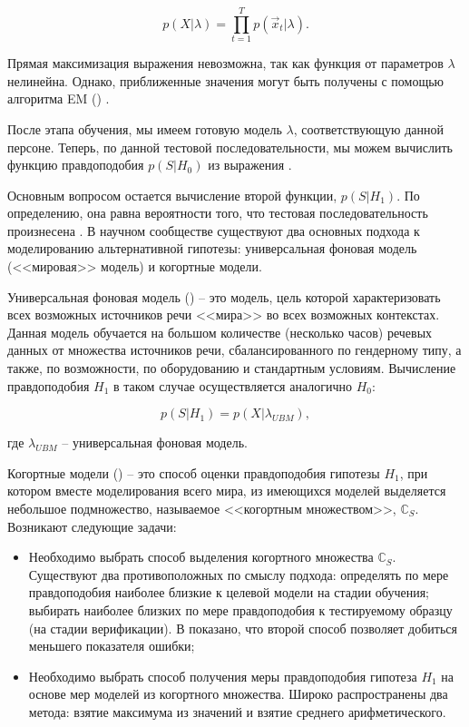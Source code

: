\begin{equation}
\label{eq:likelihood}
p(X | \lambda) = \prod_{t=1}^T p(\vec x_t | \lambda).
\end{equation}

Прямая максимизация выражения  невозможна, так как функция от параметров $\lambda$ нелинейна. Однако, приближенные значения могут быть получены с помощью алгоритма EM () \cite{Dempster77EM}.

После этапа обучения, мы имеем готовую модель $\lambda$, соответствующую данной персоне. Теперь, по данной тестовой последовательности, мы можем вычислить функцию правдоподобия $p(S|H_0)$ из выражения .

Основным вопросом остается вычисление второй функции, $p(S|H_1)$. По определению, она равна вероятности того, что тестовая последовательность произнесена . В научном сообществе существуют два основных подхода к моделированию альтернативной гипотезы: универсальная фоновая модель (<<мировая>> модель) и когортные модели.

\label{sec:analytic:ubm}
Универсальная фоновая модель () -- это модель, цель которой характеризовать всех возможных источников речи <<мира>> во всех возможных контекстах. Данная модель обучается на большом количестве (несколько часов) речевых данных от множества источников речи, сбалансированного по гендерному типу, а также, по возможности, по оборудованию и стандартным условиям. Вычисление правдоподобия $H_1$ в таком случае осуществляется аналогично $H_0$:

\begin{equation}
\label{eq:likelihood_ubm}
p(S|H_1) = p(X|\lambda_{UBM}),
\end{equation}

\noindent где $\lambda_{UBM}$ -- универсальная фоновая модель.

Когортные модели () -- это способ оценки правдоподобия гипотезы $H_1$, при котором вместе моделирования всего мира, из имеющихся моделей выделяется небольшое подмножество, называемое <<когортным множеством>>, $\mathbb{C}_S$. Возникают следующие задачи:
\begin{itemize}
\item Необходимо выбрать способ выделения когортного множества $\mathbb{C}_S$. Существуют два противоположных по смыслу подхода: определять по мере правдоподобия наиболее близкие к целевой модели на стадии обучения; выбирать наиболее близких по мере правдоподобия к тестируемому образцу (на стадии верификации). В \cite{Kinnunen04cohort} показано, что второй способ позволяет добиться меньшего показателя ошибки;
\item Необходимо выбрать способ получения меры правдоподобия гипотеза $H_1$ на основе мер моделей из когортного множества. Широко распространены два метода: взятие максимума из значений и взятие среднего арифметического.
\end{itemize}

